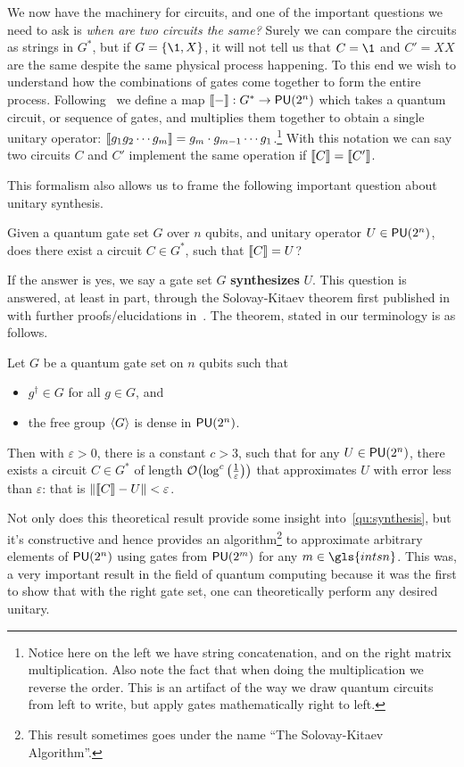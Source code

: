 We now have the machinery for circuits, and one of the important questions we need to ask is \emph{when are two circuits the same?}
Surely we can compare the circuits as strings in $G^*$, but if $G = \qty{\1, X}$, it will not tell us that $C = \1$ and $C' = XX$ are the same despite the same physical process happening.
To this end we wish to understand how the combinations of gates come together to form the entire process.
Following~\cite{formalcircuit} we define a map $\llbracket-\rrbracket: G^* \to \mathsf{PU} (2^n)$ which takes a quantum circuit, or sequence of gates, and multiplies them together to obtain a single unitary operator: $\llbracket g_1g_2\cdots g_m\rrbracket = g_m\cdot g_{m-1} \cdots g_1$.\footnote{Notice here on the left we have string concatenation, and on the right matrix multiplication. Also note the fact that when doing the multiplication we reverse the order. This is an artifact of the way we draw quantum circuits from left to write, but apply gates mathematically right to left.}
With this notation we can say two circuits $C$ and $C'$ implement the same operation if $\llbracket C\rrbracket = \llbracket C'\rrbracket$.

This formalism also allows us to frame the following important question about unitary synthesis.
\begin{question}\label{qu:synthesis}
    Given a quantum gate set $G$ over $n$ qubits, and unitary operator $U \in \mathsf{PU} (2^n)$, does there exist a circuit $C\in G^*$, such that $\llbracket C\rrbracket = U$?
\end{question}
If the answer is yes, we say a gate set $G$ \textbf{synthesizes} $U$.
This question is answered, at least in part, through the Solovay-Kitaev theorem first published in~\cite{bigkitaev} with further proofs/elucidations in~\cite{nielsenchuang,solovay-kitaev,kitaev-book}.
The theorem, stated in our terminology is as follows.
\begin{theorem}\label{thm:solovaykitaev}
    Let $G$ be a quantum gate set on $n$ qubits such that
    \begin{itemize}
        \item $g^\dagger \in G$ for all $g \in G$, and
        \item the free group $\expval{G}$ is dense in $\mathsf{PU} (2^n)$.
    \end{itemize}
    Then with $\varepsilon > 0$, there is a constant $c > 3$, such that for any $U \in \mathsf{PU} (2^n)$, there exists a circuit $C \in G^*$ of length $\order{\log^c\qty(\frac{1}{\varepsilon})}$ that approximates $U$ with error less than $\varepsilon$: that is $\norm{\llbracket C\rrbracket - U} < \varepsilon$.
\end{theorem}
Not only does this theoretical result provide some insight into~\ref{qu:synthesis}, but it's constructive and hence provides an algorithm\footnote{This result sometimes goes under the name ``The Solovay-Kitaev Algorithm''.} to approximate arbitrary elements of $\mathsf{PU} (2^n)$ using gates from $\mathsf{PU} (2^m)$ for any $m \in \gls{intsn}$.
This was, a very important result in the field of quantum computing because it was the first to show that with the right gate set, one can theoretically perform any desired unitary.


